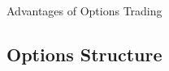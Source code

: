 \documentclass[10pt]{article}
\begin{document}
    \begin{core}{Advantages of Options Trading}









    \end{core}

  \subsection{Options Structure}
\end{document}
